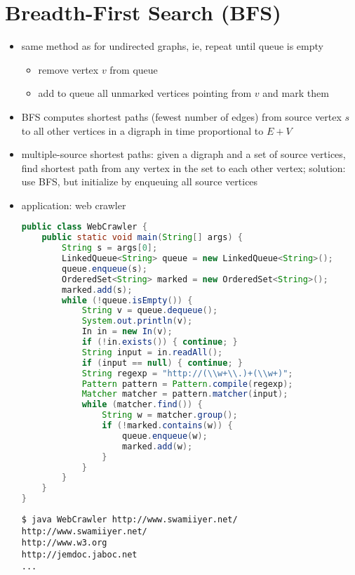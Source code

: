 \documentclass[8pt,a4paper,compress]{beamer}
\begin{document}
\section{Breadth-First Search (BFS)}
\begin{frame}[fragile]
\begin{itemize}
\item same method as for undirected graphs, ie, repeat until queue is empty
\begin{itemize}
\item remove vertex $v$ from queue

\item add to queue all unmarked vertices pointing from $v$ and mark them
\end{itemize}

\item BFS computes shortest paths (fewest number of edges)
from source vertex $s$ to all other vertices in a digraph in time proportional to $E + V$

\item multiple-source shortest paths: given a digraph and a set of source vertices, find shortest path from any vertex in the set to each other vertex; solution: use BFS, but initialize by enqueuing all source vertices
\end{itemize}
\end{frame}

\begin{frame}[fragile]
\begin{itemize}
\item application: web crawler
\begin{lstlisting}[language=Java]
public class WebCrawler { 
    public static void main(String[] args) { 
        String s = args[0];
        LinkedQueue<String> queue = new LinkedQueue<String>();
        queue.enqueue(s);
        OrderedSet<String> marked = new OrderedSet<String>();
        marked.add(s);
        while (!queue.isEmpty()) {
            String v = queue.dequeue();
            System.out.println(v);
            In in = new In(v);
            if (!in.exists()) { continue; }
            String input = in.readAll();
            if (input == null) { continue; }
            String regexp = "http://(\\w+\\.)+(\\w+)";
            Pattern pattern = Pattern.compile(regexp);
            Matcher matcher = pattern.matcher(input);
            while (matcher.find()) {
                String w = matcher.group();
                if (!marked.contains(w)) {
                    queue.enqueue(w);
                    marked.add(w);
                }
            }
        }
    }
}
\end{lstlisting}

\begin{lstlisting}[language={}]
$ java WebCrawler http://www.swamiiyer.net/
http://www.swamiiyer.net/
http://www.w3.org
http://jemdoc.jaboc.net
...
\end{lstlisting}
\end{itemize}
\end{frame}
\end{document}
